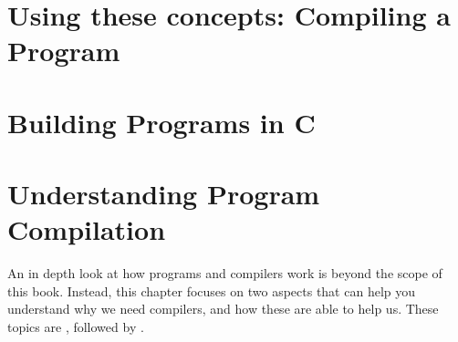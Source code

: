 



% 







\clearpage
\section{Using these concepts: Compiling a Program} %
\label{sec:using_these_concepts_compiling_a_program}




\clearpage
\def\pageLang{c}
\section{Building Programs in C} %
\label{sec:building_programs_in_c}








\clearpage
\def\pageLang{}
\section{Understanding Program Compilation} %
\label{sec:understanding_program_compilation}

An in depth look at how programs and compilers work is beyond the scope of this book. Instead, this chapter focuses on two aspects that can help you understand why we need compilers, and how these are able to help us. These topics are , followed by .

